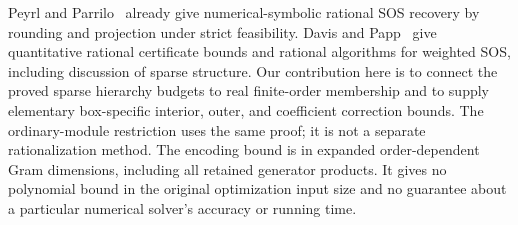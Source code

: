 Peyrl and Parrilo~\cite{peyrl2008-computing-sum-of-squares-decompositions}
already give numerical-symbolic rational SOS recovery by rounding and
projection under strict feasibility. Davis and
Papp~\cite{davis2024-rational-dual-certificates-for-weighted} give quantitative
rational certificate bounds and rational algorithms for weighted SOS,
including discussion of sparse structure. Our contribution here is to
connect the proved sparse hierarchy budgets to real finite-order membership
and to supply elementary box-specific interior, outer, and coefficient
correction bounds. The ordinary-module restriction uses the same proof;
it is not a separate rationalization method. The encoding bound is in
expanded order-dependent Gram dimensions, including all retained generator
products. It gives no polynomial bound in the original optimization input
size and no guarantee about a particular numerical solver's accuracy or
running time.

